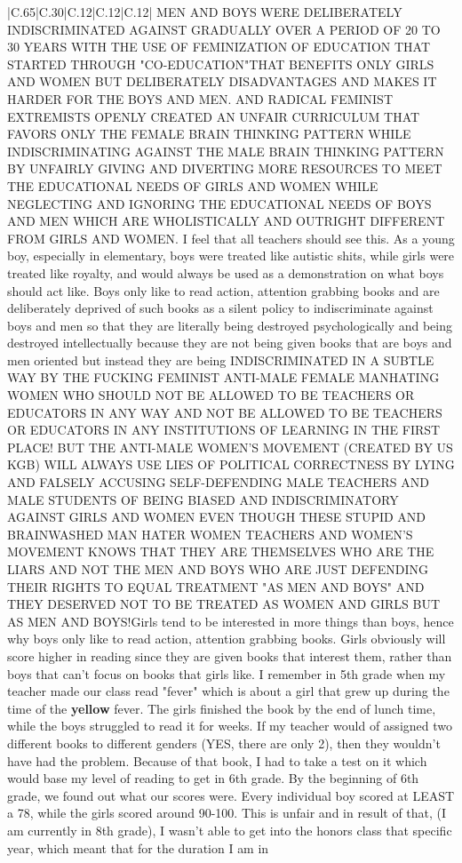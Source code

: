 \documentclass[11pt]{article}
\newlength\mylength
\begin{document}
\begin{center}
\begin{longtable}{|C{.65\mylength}|C{.30\mylength}|C{.12\mylength}|C{.12\mylength}|C{.12\mylength}|}
  \small MEN AND BOYS WERE DELIBERATELY INDISCRIMINATED AGAINST GRADUALLY OVER A PERIOD OF 20 TO 30 YEARS WITH THE USE OF FEMINIZATION OF EDUCATION THAT STARTED THROUGH "CO-EDUCATION"THAT BENEFITS ONLY GIRLS AND WOMEN BUT DELIBERATELY DISADVANTAGES AND MAKES IT HARDER FOR THE BOYS AND MEN. AND RADICAL FEMINIST EXTREMISTS OPENLY CREATED AN UNFAIR CURRICULUM THAT FAVORS ONLY THE FEMALE BRAIN THINKING PATTERN WHILE INDISCRIMINATING AGAINST THE MALE BRAIN THINKING PATTERN BY UNFAIRLY GIVING AND DIVERTING MORE RESOURCES TO MEET THE EDUCATIONAL NEEDS OF GIRLS AND WOMEN WHILE NEGLECTING AND IGNORING THE EDUCATIONAL NEEDS OF BOYS AND MEN WHICH ARE WHOLISTICALLY AND OUTRIGHT DIFFERENT FROM GIRLS AND WOMEN. I feel that all teachers should see this. As a young boy, especially in elementary, boys were treated like autistic shits, while girls were treated like royalty, and would always be used as a demonstration on what boys should act like. Boys only like to read action, attention grabbing books and are deliberately deprived of such books as a silent policy to indiscriminate against boys and men so that they are literally being destroyed psychologically and being destroyed intellectually because they are not being given books that are boys and men oriented but instead they are being INDISCRIMINATED IN A SUBTLE WAY BY THE FUCKING FEMINIST ANTI-MALE FEMALE MANHATING WOMEN WHO SHOULD NOT BE ALLOWED TO BE TEACHERS OR EDUCATORS IN ANY WAY AND NOT BE ALLOWED TO BE TEACHERS OR EDUCATORS IN ANY INSTITUTIONS OF LEARNING IN THE FIRST PLACE! BUT THE ANTI-MALE WOMEN'S MOVEMENT (CREATED BY US KGB) WILL ALWAYS USE LIES OF POLITICAL CORRECTNESS BY LYING AND FALSELY ACCUSING SELF-DEFENDING MALE TEACHERS AND MALE STUDENTS OF BEING BIASED AND INDISCRIMINATORY AGAINST GIRLS AND WOMEN EVEN THOUGH THESE STUPID AND BRAINWASHED MAN HATER WOMEN TEACHERS AND WOMEN'S MOVEMENT KNOWS THAT THEY ARE THEMSELVES WHO ARE THE LIARS AND NOT THE MEN AND BOYS WHO ARE JUST DEFENDING THEIR RIGHTS TO EQUAL TREATMENT "AS MEN AND BOYS" AND THEY DESERVED NOT TO BE TREATED AS WOMEN AND GIRLS BUT AS MEN AND BOYS!Girls tend to be interested in more things than boys, hence why boys only like to read action, attention grabbing books. Girls obviously will score higher in reading since they are given books that interest them, rather than boys that can't focus on books that girls like. I remember in 5th grade when my teacher made our class read "fever" which is about a girl that grew up during the time of the \textbf{y\textbf{e\textbf{llow}}} fever. The girls finished the book by the end of lunch time, while the boys struggled to read it for weeks. If my teacher would of assigned two different books to different genders (YES, there are only 2), then they wouldn't have had the problem. Because of that book, I had to take a test on it which would base my level of reading to get in 6th grade. By the beginning of 6th grade, we found out what our scores were. Every individual boy scored at LEAST a 78, while the girls scored around 90-100. This is unfair and in result of that, (I am currently in 8th grade), I wasn't able to get into the honors class that specific year, which meant that for the duration I am in 
\end{longtable}
\end{center}
\end{document}
